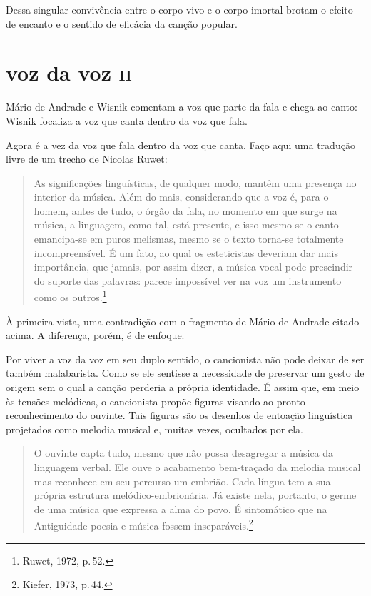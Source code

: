 Dessa singular convivência entre o corpo vivo e o corpo imortal brotam o
efeito de encanto e o sentido de eficácia da canção popular.

\section{voz da voz \textsc{ii}}

Mário de Andrade e Wisnik comentam a voz que parte da fala e chega ao
canto: Wisnik focaliza a voz que canta dentro da voz que fala.

Agora é a vez da voz que fala dentro da voz que canta. Faço aqui uma
tradução livre de um trecho de Nicolas Ruwet:

\begin{quote}
As significações linguísticas, de qualquer modo, mantêm uma presença no
interior da música. Além do mais, considerando que a voz é, para o
homem, antes de tudo, o órgão da fala, no momento em que surge na
música, a linguagem, como tal, está presente, e isso mesmo se o canto
emancipa-se em puros melismas, mesmo se o texto torna-se totalmente
incompreensível. É um fato, ao qual os esteticistas deveriam dar mais
importância, que jamais, por assim dizer, a música vocal pode prescindir
do suporte das palavras: parece impossível ver na voz um instrumento
como os outros.\footnote{Ruwet, 1972, p.\,52.} 
\end{quote}

À primeira vista, uma contradição com o fragmento de Mário de Andrade
citado acima. A diferença, porém, é de enfoque.

Por viver a voz da voz em seu duplo sentido, o cancionista não pode
deixar de ser também malabarista. Como se ele sentisse a necessidade de
preservar um gesto de origem sem o qual a canção perderia a própria
identidade. É assim que, em meio às tensões melódicas, o cancionista
propõe figuras visando ao pronto reconhecimento do ouvinte. Tais figuras
são os desenhos de entoação linguística projetados como melodia musical
e, muitas vezes, ocultados por ela.

\begin{quote}
O ouvinte capta tudo, mesmo que não possa desagregar a música da
linguagem verbal. Ele ouve o acabamento bem-traçado da melodia musical
mas reconhece em seu percurso um embrião. Cada língua tem a sua própria
estrutura melódico-embrionária. Já existe nela, portanto, o germe de uma
música que expressa a alma do povo. É sintomático que na Antiguidade
poesia e música fossem inseparáveis.\footnote{Kiefer, 1973, p.\,44.}
\end{quote}

